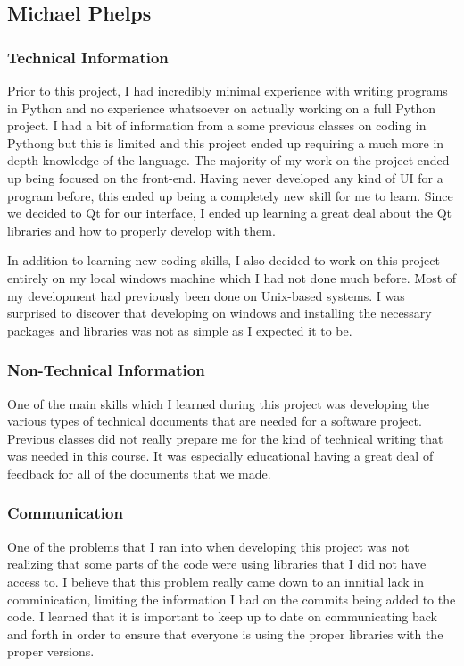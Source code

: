 \documentclass[letterpaper,10pt, onecolumn, draftclsnofoot]{IEEEtran}
\begin{document}
\subsection{Michael Phelps}
\subsubsection{Technical Information}
Prior to this project, I had incredibly minimal experience with writing programs in Python and no experience whatsoever on actually working on a full Python project. I had a bit of information from a some previous classes on coding in Pythong but this is limited and this project ended up requiring a much more in depth knowledge of the language. The majority of my work on the project ended up being focused on the front-end. Having never developed any kind of UI for a program before, this ended up being a completely new skill for me to learn. Since we decided to Qt for our interface, I ended up learning a great deal about the Qt libraries and how to properly develop with them. 

In addition to learning new coding skills, I also decided to work on this project entirely on my local windows machine which I had not done much before. Most of my development had previously been done on Unix-based systems. I was surprised to discover that developing on windows and installing the necessary packages and libraries was not as simple as I expected it to be.

\subsubsection{Non-Technical Information}
One of the main skills which I learned during this project was developing the various types of technical documents that are needed for a software project. Previous classes did not really prepare me for the kind of technical writing that was needed in this course. It was especially educational having a great deal of feedback for all of the documents that we made.

\subsubsection{Communication}
One of the problems that I ran into when developing this project was not realizing that some parts of the code were using libraries that I did not have access to. I believe that this problem really came down to an innitial lack in comminication, limiting the information I had on the commits being added to the code. I learned that it is important to keep up to date on communicating back and forth in order to ensure that everyone is using the proper libraries with the proper versions. 
\end{document}
